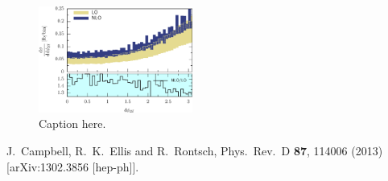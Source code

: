 \documentclass[preprint]{JHEP3} %
\begin{document}
\begin{figure}[h]
\centering %
\includegraphics[width=0.45\textwidth]{./LHC_53_Fig19.eps}
\caption{\label{fig:i} Caption here.}
\end{figure}




\begin{thebibliography}{99}

  J.~Campbell, R.~K.~Ellis and R.~Rontsch,
  Phys.\ Rev.\ D {\bf 87}, 114006 (2013)
  [arXiv:1302.3856 [hep-ph]].


\end{thebibliography}
\end{document}
